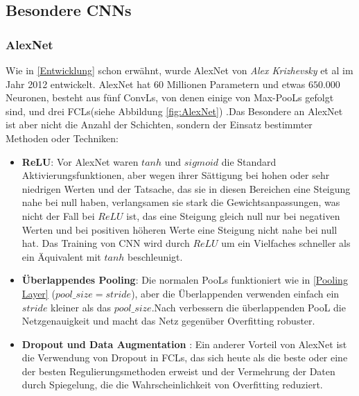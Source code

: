 \documentclass[12pt,a4paper]{scrartcl}
\numberwithin{equation}{section}
\begin{document}
\subsection{Besondere \acsp{CNN}}
\subsubsection{AlexNet}
Wie in \ref{Entwicklung} schon erwähnt, wurde AlexNet von \textit{Alex Krizhevsky} et al \cite{AlexNet} im Jahr 2012 entwickelt. AlexNet hat $ 60 $ Millionen Parametern und etwas $ 650.000 $ Neuronen, besteht aus fünf \acsp{ConvL}, von denen einige von Max-\acsp{PooL} gefolgt sind, und drei \acsp{FCL}(siehe Abbildung \ref{fig:AlexNet}) \cite{AlexNet}.Das Besondere an AlexNet ist aber nicht die Anzahl der Schichten, sondern der Einsatz bestimmter Methoden oder Techniken:
\begin{itemize}
	\item \textbf{ReLU}: Vor AlexNet waren $ tanh $ und $ sigmoid $ die Standard Aktivierungsfunktionen, aber wegen ihrer Sättigung bei hohen oder sehr niedrigen Werten und der Tatsache, das sie in diesen Bereichen eine Steigung nahe bei null haben, verlangsamen sie stark die Gewichtsanpassungen, was nicht der Fall bei $ ReLU $ ist, das eine Steigung gleich null nur bei negativen Werten und bei positiven höheren Werte  eine Steigung nicht nahe bei null hat. Das Training von \ac{CNN} wird durch $ ReLU $  um ein Vielfaches schneller als ein Äquivalent mit $ tanh $ beschleunigt\cite{AlexNet}.
	
	\item \textbf{Überlappendes Pooling}: Die normalen \acsp{PooL} funktioniert wie in \ref{Pooling Layer} ($ pool\_size = stride$), aber die Überlappenden verwenden einfach ein $ stride $ kleiner als das $ pool\_size $.Nach \cite{AlexNet} verbessern die überlappenden \ac{PooL}  die Netzgenauigkeit und macht das Netz gegenüber Overfitting robuster.
	\item \textbf{Dropout und Data Augmentation }: Ein anderer Vorteil von AlexNet ist die Verwendung von Dropout in \acsp{FCL}, das sich heute als die beste oder eine der besten Regulierungsmethoden erweist und der Vermehrung der Daten durch Spiegelung, die die Wahrscheinlichkeit von Overfitting reduziert.
\end{itemize}
\end{document}
